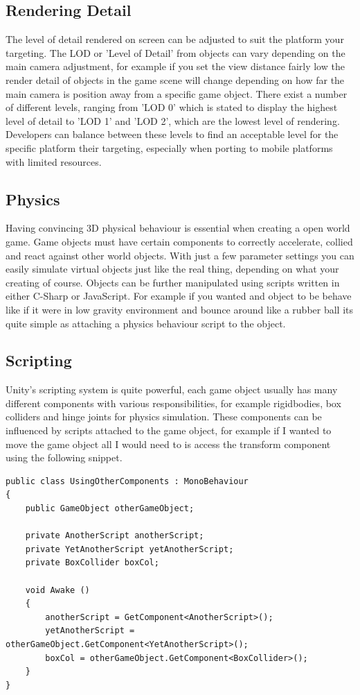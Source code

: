 \subsection{Rendering Detail}
The level of detail rendered on screen can be adjusted to suit the platform your targeting. The LOD or 'Level of Detail' from objects can vary depending on the main camera adjustment, for example if you set the view distance fairly low the render detail of objects in the game scene will change depending on how far the main camera is position away from a specific game object. There exist a number of different levels, ranging from 'LOD 0' which is stated to display the highest level of detail to 'LOD 1' and 'LOD 2', which are the lowest level of rendering. Developers can balance between these levels to find an acceptable level for the specific platform their targeting, especially when porting to mobile platforms with limited resources.

\subsection{Physics}
Having convincing 3D physical behaviour is essential when creating a open world game. Game objects must have certain components to correctly accelerate, collied and react against other world objects. With just a few parameter settings you can easily simulate virtual objects just like the real thing, depending on what your creating of course. Objects can be further manipulated using scripts written in either C-Sharp or JavaScript. For example if you wanted and object to be behave like if it were in low gravity environment and bounce around like a rubber ball its quite simple as attaching a physics behaviour script to the object. 

\subsection{Scripting}
Unity's scripting system is quite powerful, each game object usually has many different components with various responsibilities, for example rigidbodies, box colliders and hinge joints for physics simulation. These components can be influenced by scripts attached to the game object, for example if I wanted to move the game object all I would need to is access the transform component using the following snippet.

\begin{verbatim}
public class UsingOtherComponents : MonoBehaviour
{
	public GameObject otherGameObject;
	
	private AnotherScript anotherScript;
	private YetAnotherScript yetAnotherScript;
	private BoxCollider boxCol;
	
	void Awake ()
	{
		anotherScript = GetComponent<AnotherScript>();
		yetAnotherScript = otherGameObject.GetComponent<YetAnotherScript>();
		boxCol = otherGameObject.GetComponent<BoxCollider>();
	}
}
\end{verbatim}

